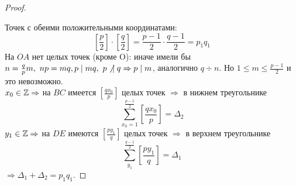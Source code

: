 \begin{proof}
\begin{center}
        \end{center}
        Точек с обеими положительными координатами: 
        \[[\frac{p}{2}]\cdot[\frac{q}{2}]=\frac{p-1}{2}\cdot \frac{q-1}{2}=p_1 q_1\] 
        На $OA$ нет целых точек (кроме O): иначе имели бы $n=\frac{q}{p}m,\ np=mq,\\
        p\div mq,\ p\not\hspace*{4pt}\div q \Rightarrow p\div m$, аналогично $q\div n$. Но $1\leq m\leq \frac{p-1}{2}$ и это невозможно.\\
        $x_0\in \Z \Rightarrow$ на $BC$ имеется $[\frac{qx_0}{p}]$ целых точек $\Rightarrow$ в нижнем треугольнике 
        \[\sum\limits_{x_0=1}^{\frac{p-1}{2}}[\frac{qx_0}{p}]=\Delta_2\]
        $y_1\in \Z \Rightarrow$ на $DE$ имеются $[\frac{py_1}{q}]$ целых точек $\Rightarrow$ в верхнем треугольнике 
        \[\sum\limits_{y_1}^{\frac{q-1}{2}}[\frac{py_1}{q}]=\Delta_1\]
        $\Rightarrow \Delta_1+\Delta_2=p_1 q_1$.  
    \end{proof} 
\newpage
